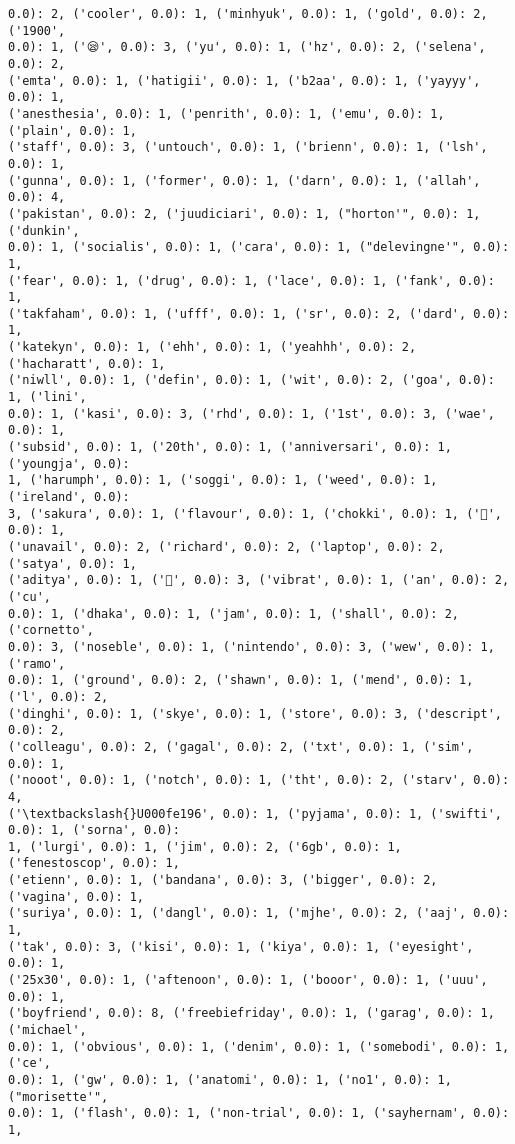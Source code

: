 \documentclass[11pt]{article}
\begin{document}
\begin{Verbatim}[commandchars=\\\{\}]
0.0): 2, ('cooler', 0.0): 1, ('minhyuk', 0.0): 1, ('gold', 0.0): 2, ('1900',
0.0): 1, ('😪', 0.0): 3, ('yu', 0.0): 1, ('hz', 0.0): 2, ('selena', 0.0): 2,
('emta', 0.0): 1, ('hatigii', 0.0): 1, ('b2aa', 0.0): 1, ('yayyy', 0.0): 1,
('anesthesia', 0.0): 1, ('penrith', 0.0): 1, ('emu', 0.0): 1, ('plain', 0.0): 1,
('staff', 0.0): 3, ('untouch', 0.0): 1, ('brienn', 0.0): 1, ('lsh', 0.0): 1,
('gunna', 0.0): 1, ('former', 0.0): 1, ('darn', 0.0): 1, ('allah', 0.0): 4,
('pakistan', 0.0): 2, ('juudiciari', 0.0): 1, ("horton'", 0.0): 1, ('dunkin',
0.0): 1, ('socialis', 0.0): 1, ('cara', 0.0): 1, ("delevingne'", 0.0): 1,
('fear', 0.0): 1, ('drug', 0.0): 1, ('lace', 0.0): 1, ('fank', 0.0): 1,
('takfaham', 0.0): 1, ('ufff', 0.0): 1, ('sr', 0.0): 2, ('dard', 0.0): 1,
('katekyn', 0.0): 1, ('ehh', 0.0): 1, ('yeahhh', 0.0): 2, ('hacharatt', 0.0): 1,
('niwll', 0.0): 1, ('defin', 0.0): 1, ('wit', 0.0): 2, ('goa', 0.0): 1, ('lini',
0.0): 1, ('kasi', 0.0): 3, ('rhd', 0.0): 1, ('1st', 0.0): 3, ('wae', 0.0): 1,
('subsid', 0.0): 1, ('20th', 0.0): 1, ('anniversari', 0.0): 1, ('youngja', 0.0):
1, ('harumph', 0.0): 1, ('soggi', 0.0): 1, ('weed', 0.0): 1, ('ireland', 0.0):
3, ('sakura', 0.0): 1, ('flavour', 0.0): 1, ('chokki', 0.0): 1, ('🌸', 0.0): 1,
('unavail', 0.0): 2, ('richard', 0.0): 2, ('laptop', 0.0): 2, ('satya', 0.0): 1,
('aditya', 0.0): 1, ('🍜', 0.0): 3, ('vibrat', 0.0): 1, ('an', 0.0): 2, ('cu',
0.0): 1, ('dhaka', 0.0): 1, ('jam', 0.0): 1, ('shall', 0.0): 2, ('cornetto',
0.0): 3, ('noseble', 0.0): 1, ('nintendo', 0.0): 3, ('wew', 0.0): 1, ('ramo',
0.0): 1, ('ground', 0.0): 2, ('shawn', 0.0): 1, ('mend', 0.0): 1, ('l', 0.0): 2,
('dinghi', 0.0): 1, ('skye', 0.0): 1, ('store', 0.0): 3, ('descript', 0.0): 2,
('colleagu', 0.0): 2, ('gagal', 0.0): 2, ('txt', 0.0): 1, ('sim', 0.0): 1,
('nooot', 0.0): 1, ('notch', 0.0): 1, ('tht', 0.0): 2, ('starv', 0.0): 4,
('\textbackslash{}U000fe196', 0.0): 1, ('pyjama', 0.0): 1, ('swifti', 0.0): 1, ('sorna', 0.0):
1, ('lurgi', 0.0): 1, ('jim', 0.0): 2, ('6gb', 0.0): 1, ('fenestoscop', 0.0): 1,
('etienn', 0.0): 1, ('bandana', 0.0): 3, ('bigger', 0.0): 2, ('vagina', 0.0): 1,
('suriya', 0.0): 1, ('dangl', 0.0): 1, ('mjhe', 0.0): 2, ('aaj', 0.0): 1,
('tak', 0.0): 3, ('kisi', 0.0): 1, ('kiya', 0.0): 1, ('eyesight', 0.0): 1,
('25x30', 0.0): 1, ('aftenoon', 0.0): 1, ('booor', 0.0): 1, ('uuu', 0.0): 1,
('boyfriend', 0.0): 8, ('freebiefriday', 0.0): 1, ('garag', 0.0): 1, ('michael',
0.0): 1, ('obvious', 0.0): 1, ('denim', 0.0): 1, ('somebodi', 0.0): 1, ('ce',
0.0): 1, ('gw', 0.0): 1, ('anatomi', 0.0): 1, ('no1', 0.0): 1, ("morisette'",
0.0): 1, ('flash', 0.0): 1, ('non-trial', 0.0): 1, ('sayhernam', 0.0): 1,

\end{Verbatim}
\end{document}
